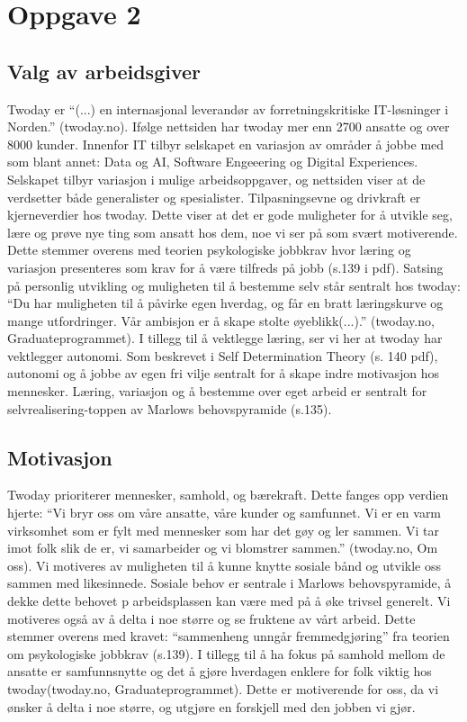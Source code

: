 \section{Oppgave 2}
\subsection{Valg av arbeidsgiver}
Twoday er “(...) en internasjonal leverandør av forretningskritiske IT-løsninger i Norden.” 
(twoday.no). Ifølge nettsiden har twoday mer enn 2700 ansatte og over 8000 kunder. Innenfor IT 
tilbyr selskapet en variasjon av områder å jobbe med som blant annet: Data og AI, Software Engeeering 
og Digital Experiences. Selskapet tilbyr variasjon i mulige arbeidsoppgaver, og nettsiden viser at de
 verdsetter både generalister og spesialister. Tilpasningsevne og drivkraft er kjerneverdier hos twoday.
   Dette viser at det er gode muligheter for å utvikle seg, lære og prøve nye ting som ansatt hos dem, 
   noe vi ser på som svært motiverende. Dette stemmer overens med teorien psykologiske jobbkrav hvor 
   læring og variasjon presenteres som krav for å være tilfreds på jobb (s.139 i pdf). Satsing på 
   personlig utvikling og muligheten til å bestemme selv står sentralt hos twoday: “Du har muligheten 
   til å påvirke egen hverdag, og får en bratt læringskurve og mange utfordringer. Vår ambisjon er å
    skape stolte øyeblikk(...).” (twoday.no, Graduateprogrammet). I tillegg til å vektlegge læring, ser
    vi her at twoday har vektlegger autonomi. Som beskrevet i Self Determination Theory (s. 140 pdf), 
    autonomi og å jobbe av egen fri vilje sentralt for å skape indre motivasjon hos mennesker. Læring, 
    variasjon og å bestemme over eget arbeid er sentralt for selvrealisering-toppen av Marlows 
    behovspyramide (s.135).


\subsection{Motivasjon}
Twoday prioriterer mennesker, samhold, og bærekraft. Dette fanges opp verdien hjerte:
 “Vi bryr oss om våre ansatte, våre kunder og samfunnet. Vi er en varm virksomhet som er fylt 
 med mennesker som har det gøy og ler sammen. Vi tar imot folk slik de er, vi samarbeider og vi 
 blomstrer sammen.” (twoday.no, Om oss). Vi motiveres av muligheten til å kunne knytte sosiale bånd 
 og utvikle oss sammen med likesinnede. Sosiale behov er sentrale i Marlows behovspyramide, å dekke 
 dette behovet p arbeidsplassen kan være med på å øke trivsel generelt. Vi motiveres også av å delta 
 i noe større og se fruktene av vårt arbeid. Dette stemmer overens med kravet: “sammenheng unngår 
 fremmedgjøring” fra teorien om psykologiske jobbkrav (s.139). I tillegg til å ha fokus på samhold 
 mellom de ansatte er samfunnsnytte og det å gjøre hverdagen enklere for folk viktig hos 
 twoday(twoday.no, Graduateprogrammet). Dette er motiverende for oss, da vi ønsker å delta i noe 
 større, og utgjøre en forskjell med den jobben vi gjør.  